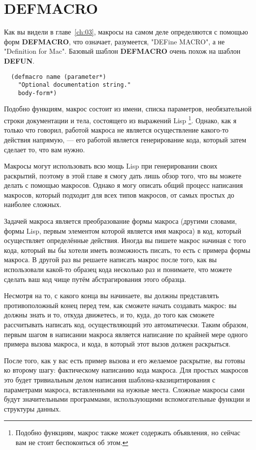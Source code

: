 \section{DEFMACRO}

Как вы видели в главе~\ref{ch:03}, макросы на самом деле определяются с помощью форм
\textbf{DEFMACRO}, что означает, разумеется, "DEFine MACRO", а не "Definition for
Mac". Базовый шаблон \textbf{DEFMACRO} очень похож на шаблон \textbf{DEFUN}.

\begin{lstlisting}
  (defmacro name (parameter*)
    "Optional documentation string."
    body-form*)
\end{lstlisting}

Подобно функциям, макрос состоит из имени, списка параметров, необязательной строки
документации и тела, состоящего из выражений Lisp \footnote{Подобно функциям, макрос также
  может содержать объявления, но сейчас вам не стоит беспокоиться об этом.}. Однако, как я
только что говорил, работой макроса не является осуществление какого-то действия напрямую,
--- его работой является генерирование кода, который затем сделает то, что вам нужно.

Макросы могут использовать всю мощь Lisp при генерировании своих раскрытий, поэтому в этой
главе я смогу дать лишь обзор того, что вы можете делать с помощью макросов. Однако я могу
описать общий процесс написания макросов, который подходит для всех типов макросов, от
самых простых до наиболее сложных.

Задачей макроса является преобразование формы макроса (другими словами, формы Lisp, первым
элементом которой является имя макроса) в код, который осуществляет определённые
действия. Иногда вы пишете макрос начиная с того кода, который вы бы хотели иметь
возможность писать, то есть с примера формы макроса. В другой раз вы решаете написать
макрос после того, как вы использовали какой-то образец кода несколько раз и понимаете,
что можете сделать ваш код чище путём абстрагирования этого образца.

Несмотря на то, с какого конца вы начинаете, вы должны представлять противоположный конец
перед тем, как сможете начать создавать макрос: вы должны знать и то, откуда движетесь, и
то, куда, до того как сможете рассчитывать написать код, осуществляющий это
автоматически. Таким образом, первым шагом в написании макроса является написание по
крайней мере одного примера вызова макроса, и кода, в который этот вызов должен
раскрыться.

После того, как у вас есть пример вызова и его желаемое раскрытие, вы готовы ко второму
шагу: фактическому написанию кода макроса. Для простых макросов это будет тривиальным
делом написания шаблона-квазицитирования с параметрами макроса, вставленными на нужные
места. Сложные макросы сами будут значительными программами, использующими вспомогательные
функции и структуры данных.

